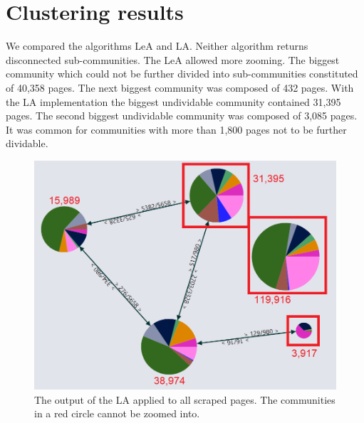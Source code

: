 \label{evaluation}
\section{Clustering results}\label{clusteringEvaluation}
We compared the algorithms LeA and LA. Neither algorithm returns disconnected sub-communities. The LeA allowed more zooming. The biggest community which could not be further divided into sub-communities constituted of 40,358 pages. The next biggest community was composed of 432 pages. With the LA implementation the biggest undividable community contained 31,395 pages. The second biggest undividable community was composed of 3,085 pages. It was common for communities with more than 1,800 pages not to be further dividable.
\begin{figure}[ht]
    \centering
    \includegraphics[width =\textwidth]{Images/LA.png}
    \caption{ The output of the LA applied to all scraped pages. The communities in a red circle cannot be zoomed into.}
    \label{LAFigure}
\end{figure}

